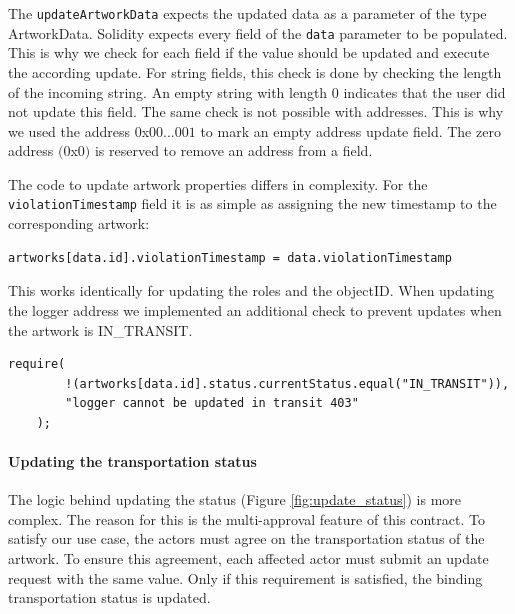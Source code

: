 

The \texttt{updateArtworkData} expects the updated data as a parameter of the type ArtworkData. Solidity expects every field of the \texttt{data} parameter to be populated. This is why we check for each field if the value should be updated and execute the according update. For string fields, this check is done by checking the length of the incoming string. An empty string with length $0$ indicates that the user did not update this field. The same check is not possible with addresses. This is why we used the address $0$x$00...001$ to mark an empty address update field. The zero address $(0$x$0)$ is reserved to remove an address from a field.

The code to update artwork properties differs in complexity. For the \texttt{violationTimestamp} field it is as simple as assigning the new timestamp to the corresponding artwork: 
\begin{lstlisting}[language=Solidity]
    artworks[data.id].violationTimestamp = data.violationTimestamp
\end{lstlisting}
This works identically for updating the roles and the objectID. When updating the logger address we implemented an additional check to prevent updates when the artwork is IN\_TRANSIT.
\begin{lstlisting}[language=Solidity]
    require(
        !(artworks[data.id].status.currentStatus.equal("IN_TRANSIT")),
        "logger cannot be updated in transit 403"
    );
\end{lstlisting}

\paragraph{Updating the transportation status}
\label{sec:update_status}
The logic behind updating the status (Figure \ref{fig:update_status}) is more complex. The reason for this is the multi-approval feature of this contract. To satisfy our use case, the actors must agree on the transportation status of the artwork. To ensure this agreement, each affected actor must submit an update request with the same value. Only if this requirement is satisfied, the binding transportation status is updated. 

